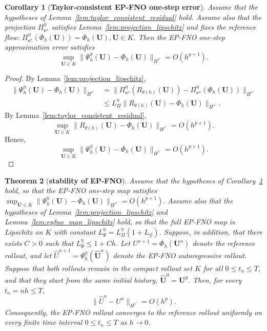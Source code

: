 \documentclass[11pt,a4paper]{article}
\newtheorem{theorem}{Theorem}[section]
\newtheorem{corollary}[theorem]{Corollary}
\theoremstyle{definition}
\theoremstyle{remark}
\numberwithin{equation}{section}
\numberwithin{figure}{section}
\numberwithin{table}{section}
\begin{document}
\begin{corollary}[\textbf{Taylor-consistent EP-FNO one-step error}]
\label{cor:taylor_consistent_epfno}
Assume that the hypotheses of Lemma~\ref{lem:taylor_consistent_residual} hold.
Assume also that the projection \(\Pi_{\mathbf c^\star}^{\eta}\) satisfies
Lemma~\ref{lem:projection_lipschitz} and fixes the reference flow:
$\Pi_{\mathbf c^\star}^{\eta}(\Phi_h(\mathbf U))
    =
    \Phi_h(\mathbf U),
 \mathbf U\in K.$
Then the EP-FNO one-step approximation error satisfies
\[
 \sup_{\mathbf U\in K}
    \|\Psi_h^\eta(\mathbf U)-\Phi_h(\mathbf U)\|_{H^{s'}}
    =
    O(h^{p+1}).
\]
\end{corollary}

\begin{proof}
By Lemma~\ref{lem:projection_lipschitz},
\[
\begin{aligned}
    \|\Psi_h^\eta(\mathbf U)-\Phi_h(\mathbf U)\|_{H^{s'}}
    &=
    \|\Pi_{\mathbf c^\star}^{\eta}(R_{\theta(h)}(\mathbf U))
    -
    \Pi_{\mathbf c^\star}^{\eta}(\Phi_h(\mathbf U))\|_{H^{s'}} \\
    &\le
    L_\Pi^\eta
    \|R_{\theta(h)}(\mathbf U)-\Phi_h(\mathbf U)\|_{H^{s'}}.
\end{aligned}
\]
By Lemma~\ref{lem:taylor_consistent_residual},
\[
    \sup_{\mathbf U\in K}
    \|R_{\theta(h)}(\mathbf U)-\Phi_h(\mathbf U)\|_{H^{s'}}
    =
    O(h^{p+1}).
\]
Hence,
\[
\sup_{\mathbf U\in K}\|\Psi_h^\eta(\mathbf U)-\Phi_h(\mathbf U)\|_{H^{s'}}
    =
    O(h^{p+1}).
\]
\end{proof}

\begin{theorem}[\textbf{stability of EP-FNO}]
\label{thm:epfno_finite_time_rollout_stability}
Assume that the hypotheses of
Corollary~\ref{cor:taylor_consistent_epfno} hold, so that the EP-FNO
one-step map satisfies
$
    \sup_{\mathbf U\in K}
    \|\Psi_h^\eta(\mathbf U)-\Phi_h(\mathbf U)\|_{H^{s'}}
    =
    O(h^{p+1}) .
$
Assume also that the hypotheses of
Lemma~\ref{lem:projection_lipschitz} and
Lemma~\ref{lem:epfno_map_lipschitz} hold, so that the full EP-FNO map is
Lipschitz on \(K\) with constant
$L_\Psi^\eta=L_\Pi^\eta(1+L_{\mathcal G})$.
Suppose, in addition, that there exists \(C>0\) such that
$L_\Psi^\eta\le 1+Ch$.
Let
$
    U^{n+1}=\Phi_h(\mathbf U^n)
$
denote the reference rollout, and let
$
    \widehat U^{n+1}
    =
    \Psi_h^\eta(\widehat{\mathbf U}^n)
$
denote the EP-FNO autoregressive rollout. Suppose that both rollouts remain in
the compact rollout set \(K\) for all \(0\le t_n\le T\), and that they start
from the same initial history,
$
    \widehat{\mathbf U}^0=\mathbf U^0 .
$
Then, for every \(t_n=nh\le T\),
\[
    \|\widehat U^n-U^n\|_{H^{s'}}
    =
    O(h^p).
\]
Consequently, the EP-FNO rollout converges to the reference rollout uniformly
on every finite time interval \(0\le t_n\le T\) as \(h\to 0\).
\end{theorem}
\end{document}
